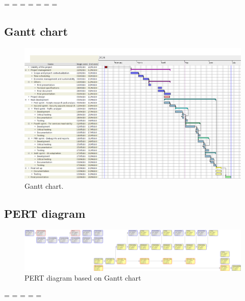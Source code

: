 \pagebreak

\paperwidth=\pdfpageheight
\paperheight=\pdfpagewidth
\pdfpageheight=\paperheight
\pdfpagewidth=\paperwidth
\headwidth=\textheight
\begingroup 
\vsize=\textwidth
\hsize=\textheight

\subsection{Gantt chart}
\label{ssec:gantt}

\begin{figure}[!ht]
\hspace{2cm}\includegraphics[width=20cm]{graphics/ganttTotal}
\caption{Gantt chart.}
\end{figure}


\newpage

\subsection{PERT diagram}
\label{ssec:pert}

\begin{figure}[!ht]
\vspace{2cm}
\hspace{-0.5cm}\includegraphics[width=25cm]{graphics/pertChart}
\vspace{0.5cm}
\caption{PERT diagram based on Gantt chart}
\end{figure}

\endgroup

\pagebreak

\paperwidth=\pdfpageheight
\paperheight=\pdfpagewidth
\pdfpageheight=\paperheight
\pdfpagewidth=\paperwidth
\headwidth=\textwidth
